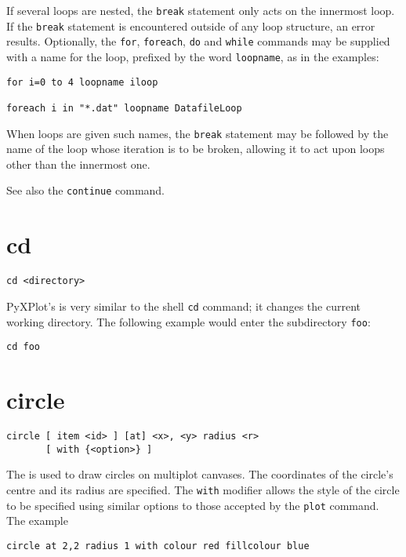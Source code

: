 If several loops are nested, the {\tt break} statement only acts on the
innermost loop. If the {\tt break} statement is encountered outside of any loop
structure, an error results. Optionally, the {\tt for}, {\tt foreach}, {\tt do}
and {\tt while} commands may be supplied with a name for the loop, prefixed by
the word {\tt loopname}, as in the examples:

\begin{verbatim}
for i=0 to 4 loopname iloop

foreach i in "*.dat" loopname DatafileLoop
\end{verbatim}

\noindent When loops are given such names, the {\tt break} statement may be
followed by the name of the loop whose iteration is to be broken, allowing it
to act upon loops other than the innermost one.

See also the {\tt continue} command.


\section{cd}

\begin{verbatim}
cd <directory>
\end{verbatim}

PyXPlot's  is very similar to the shell {\tt cd} command; it
changes the current working directory. The following example would enter the
subdirectory {\tt foo}:

\begin{verbatim}
cd foo
\end{verbatim}


\section{circle}

\begin{verbatim}
circle [ item <id> ] [at] <x>, <y> radius <r>
       [ with {<option>} ]
\end{verbatim}

The  is used to draw circles on multiplot canvases.  The
coordinates of the circle's centre and its radius are specified. The {\tt with}
modifier allows the style of the circle to be specified using similar options
to those accepted by the {\tt plot} command.  The example

\begin{verbatim}
circle at 2,2 radius 1 with colour red fillcolour blue
\end{verbatim}

